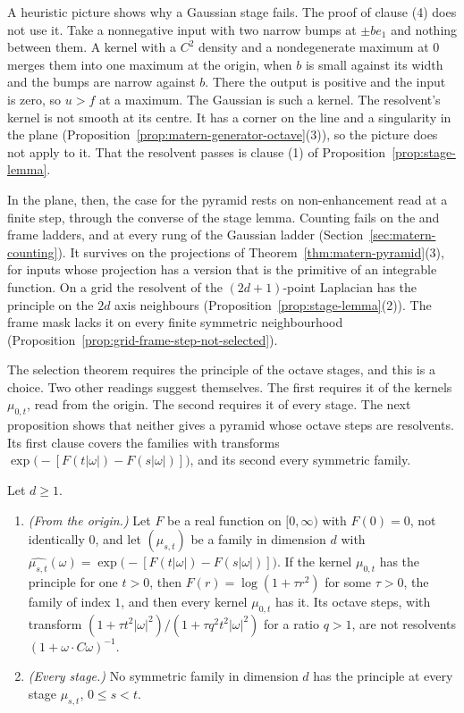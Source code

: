 A heuristic picture shows why a Gaussian stage fails. The proof of clause (4) does not use it. Take
a nonnegative input with two narrow bumps at $\pm be_1$ and nothing between them. A kernel with a
$C^2$ density and a nondegenerate maximum at $0$ merges them into one maximum at the origin, when
$b$ is small against its width and the bumps are narrow against $b$. There the output is positive
and the input is zero, so $u > f$ at a maximum. The Gaussian is such a kernel. The resolvent's
kernel is not smooth at its centre. It has a corner on the line and a singularity in the plane
(Proposition~\ref{prop:matern-generator-octave}(3)), so the picture does not apply to it. That the
resolvent passes is clause (1) of Proposition~\ref{prop:stage-lemma}.

In the plane, then, the case for the \Matern{} pyramid rests on non-enhancement read at a finite
step, through the converse of the stage lemma. Counting fails on the \Matern{} and frame \Matern{}
ladders, and at every rung of the Gaussian ladder (Section~\ref{sec:matern-counting}). It survives on
the projections of Theorem~\ref{thm:matern-pyramid}(3), for inputs whose projection has a version
that is the primitive of an integrable function. On a grid the resolvent of the $(2d+1)$-point
Laplacian has the principle on the $2d$ axis neighbours (Proposition~\ref{prop:stage-lemma}(2)).
The frame mask lacks it on every finite symmetric neighbourhood
(Proposition~\ref{prop:grid-frame-step-not-selected}).

The selection theorem requires the principle of the octave stages, and this is a choice. Two other
readings suggest themselves. The first requires it of the kernels $\mu_{0,t}$, read from the
origin. The second requires it of every stage. The next proposition shows that neither gives a
pyramid whose octave steps are resolvents. Its first clause covers the families with transforms
$\exp\bigl(-[F(t|\omega|) - F(s|\omega|)]\bigr)$, and its second every symmetric family.

\begin{proposition}
\label{prop:principle-other-readings}

Let $d \ge 1$.
\begin{enumerate}
\item \emph{(From the origin.)} Let $F$ be a real function on $[0, \infty)$ with $F(0) = 0$, not
identically $0$, and let
$(\mu_{s,t})$ be a family in dimension $d$ with
$\widehat{\mu_{s,t}}(\omega) = \exp\bigl(-[F(t|\omega|) - F(s|\omega|)]\bigr)$. If the kernel
$\mu_{0,t}$ has the principle for one $t > 0$, then $F(r) = \log(1 + \tau r^2)$ for some
$\tau > 0$, the \Matern{} family of index $1$, and then every kernel $\mu_{0,t}$ has it. Its octave
steps, with transform $(1 + \tau t^2|\omega|^2)/(1 + \tau q^2t^2|\omega|^2)$ for a ratio $q > 1$, are
not resolvents $(1 + \omega\cdot C\omega)^{-1}$.
\item \emph{(Every stage.)} No symmetric family in dimension $d$ has the principle at every stage
$\mu_{s,t}$, $0 \le s < t$.
\end{enumerate}
\end{proposition}


